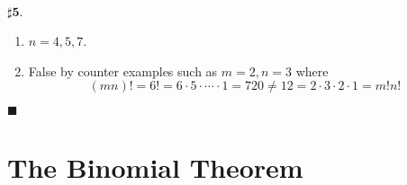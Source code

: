 \documentclass[atbegshi, chapter]{memoir}
\begin{document}
\hfill\break
$\pmb{\sharp5.}$
\begin{enumerate}[label=(\alph*)]
  \item $n=4,5,7$.
  \item False by counter examples such as $m=2,n=3$ where
    \[
      (mn)!=6!=6\cdot5\cdot\cdots\cdot1=720\neq
      12=2\cdot3\cdot2\cdot1=m!n!
    \]
\end{enumerate}\hfill$\blacksquare$
\section{The Binomial Theorem}
\end{document}
